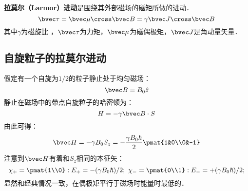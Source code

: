 \textbf{拉莫尔（Larmor）进动}是围绕其外部磁场的磁矩所做的进动．
\begin{equation}
\bvec \tau = \bvec\mu\cross\bvec B=\gamma\bvec J\cross \bvec B
\end{equation}
其中$\gamma$为磁旋比 ，$\bvec\tau$为力矩，$\bvec \mu$为磁偶极矩，$\bvec J$是角动量矢量．

\subsection{自旋粒子的拉莫尔进动}

假定有一个自旋为$1/2$的粒子静止处于均匀磁场：
\begin{equation}
\bvec B =B_0\hat{z}
\end{equation}
静止在磁场中的带点自旋粒子的哈密顿为：
\begin{equation}
H = -\gamma\bvec B\cdot S
\end{equation}
由此可得：
\begin{equation}
\bvec H = -\gamma B_0S_z=-\frac{\gamma B_0\hbar}{2}\pmat{1&0\\0&-1}
\end{equation}
注意到$\bvec H$有着和$S_z$相同的本征矢：
\begin{equation}
\chi_+ = \pmat{1\\0}:E_+=-(\gamma B_0\hbar)/2; \ \chi_- = \pmat{0\\1}:E_-=+(\gamma B_0\hbar)/2; 
\end{equation}
显然和经典情况一致，在偶极矩平行于磁场时能量时最低的．

